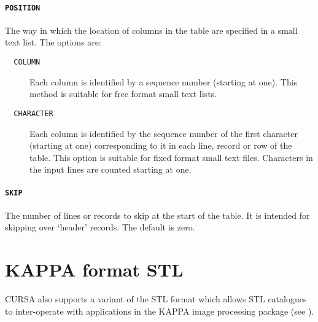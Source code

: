 \documentclass[twoside,11pt]{starlink}
\begin{document}
\paragraph{\texttt{POSITION}} The way in which the location of columns in
the table are specified in a small text list.  The options are:

\begin{description}

  \item[\texttt{~~COLUMN}] Each column is identified by a sequence number
   (starting at one).  This method is suitable for free format small
   text lists.

  \item[\texttt{~~CHARACTER}] Each column is identified by the
   sequence number of the first character (starting at one)
   corresponding to it in each line, record or row of the table.  This
   option is suitable for
   fixed format small text files.
   Characters in the input lines are counted starting at one.

\end{description}



\paragraph{\texttt{SKIP}} The number of lines or records to skip at the
start of the table.  It is intended for skipping over `header' records.
The default is zero.


\section{\label{STLKAP}KAPPA format STL}

CURSA also supports a variant of the STL format which allows STL
catalogues to inter-operate with applications in the KAPPA image
processing package (see \cite{SUN95}).
\end{document}
